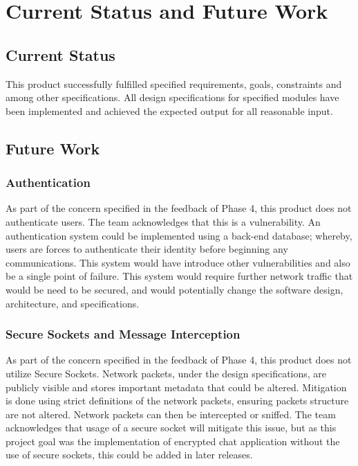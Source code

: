 \documentclass[sigconf]{acmart}
\begin{document}
\section{Current Status and Future Work}
\subsection{Current Status}
This product successfully fulfilled specified requirements, goals, constraints
and among other specifications. All design specifications for specified modules
have been implemented and achieved the expected output for all reasonable input.
\subsection{Future Work}
\subsubsection{Authentication}
As part of the concern specified in the feedback of Phase 4, this product does
not authenticate users. The team acknowledges that this is a vulnerability.
An authentication system could be implemented using a back-end database;
whereby, users are forces to authenticate their identity before beginning any
communications. This system would have introduce other vulnerabilities and also
be a single point of failure. This system would require further network traffic
that would be need to be secured, and would potentially change the software
design, architecture, and specifications.
\subsubsection{Secure Sockets and Message Interception}
As part of the concern specified in the feedback of Phase 4, this product does
not utilize Secure Sockets. Network packets, under the design specifications,
are publicly visible and stores important metadata that could be altered.
Mitigation is done using strict definitions of the network packets, ensuring
packets structure are not altered. Network packets can then be intercepted or
sniffed. The team acknowledges that usage of a secure socket will mitigate this
issue, but as this project goal was the implementation of encrypted chat
application without the use of secure sockets, this could be added in later
releases.
\end{document}
